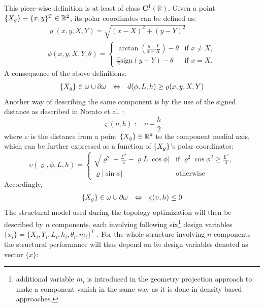 This piece-wise definition is at least of class $\mathbf{C}^1(\mathbb{R})$. Given a point $ \left\{{X_g}\right\}\equiv \lbrace x,y \rbrace^T\in \mathbb{R}^2$, its polar coordinates can be defined as:
\begin{eqnarray}
    \varrho(x,y,X,Y)=\sqrt{(x-X)^2+(y-Y)^2}\\
    \phi(x,y,X,Y,\theta)  = \begin{cases}
    \arctan{\left(\frac{y-Y}{x-X}\right)}-\theta & \text{if } x\neq X,\\
    \frac{\pi}{2}\text{sign}(y-Y)-\theta & \text{if } x= X.
    \end{cases}
\end{eqnarray}
A consequence of the above definitions:
\begin{equation}
    \begin{array}{ccc}
   \left\{{X_g}\right\} \in \omega \cup \partial \omega & \Leftrightarrow & d(\phi,L,h)\geq \varrho(x,y,X,Y)
    \end{array}
\end{equation}
Another way of describing the same component is by the use of the signed distance as described in Norato et al. \cite{norato2015geometry}:
\begin{equation}
\label{varsimga}
    \varsigma(\upsilon,h):=\upsilon-\frac{h}{2}
\end{equation}
where $\upsilon$ is the distance from a point $ \left\{{X_g}\right\}\in \mathbb{R}^2$ to the component medial axis, which can be further expressed as a function of $ \left\{{X_g}\right\}$'s polar coordinates:
\begin{equation}
\label{upsilon}
     \upsilon(\varrho,\phi,L,h)=\begin{cases}
    \sqrt{\varrho^2+\frac{L^2}{4}-\varrho L|\cos{\phi}|} & \text{if }\varrho^2\cos{\phi}^2\geq \frac{L^2}{4},\\
               \varrho|\sin{\phi}| & \text{otherwise}
    \end{cases}
\end{equation}
Accordingly,
\begin{equation}
    \begin{array}{ccc}
   \left\{{X_g}\right\} \in \omega \cup \partial \omega & \Leftrightarrow & \varsigma(\upsilon,h)\leq 0\\
    \end{array}
\end{equation}
The structural model used during the topology optimization will then be described by $n$ components, each involving following six\footnote{additional variable $m_i$ is introduced in the geometry projection approach to make a component vanish in the same way as it is done in density based approaches.} design variables\\ $\lbrace x_i\rbrace=\lbrace X_i,Y_i,L_i,h_i,\theta_i ,m_i\rbrace^T$ . For the whole structure involving $n$ components the structural performance will thus depend on $6n$ design variables denoted as vector $\lbrace x\rbrace$:
